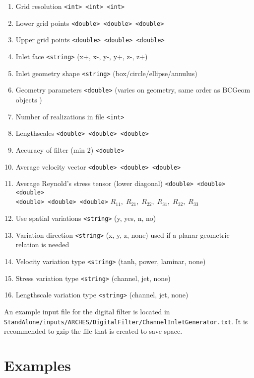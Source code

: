 \begin{enumerate}
\item Grid resolution \verb=<int> <int> <int>=
\item Lower grid points \verb=<double> <double> <double>=
\item Upper grid points \verb=<double> <double> <double>=
\item Inlet face \verb=<string>= (x+, x-, y-, y+, z-, z+)
\item Inlet geometry shape \verb=<string>= (box/circle/ellipse/annulus)
\item Geometry parameters \verb=<double>= (varies on geometry, same order as BCGeom objects )
\item Number of realizations in file \verb=<int>=
\item Lengthscales \verb=<double> <double> <double>=
\item Accuracy of filter (min 2) \verb=<double>=
\item Average velocity vector \verb=<double> <double> <double>=
\item Average Reynold's stress tensor (lower diagonal) \verb=<double> <double> <double>= \\
\verb=<double> <double> <double>= $R_{11},\; R_{21},\; R_{22},\; R_{31},\; R_{32},\; R_{33} $
\item Use spatial variations \verb=<string>= (y, yes, n, no)
\item Variation direction \verb=<string>= (x, y, z, none) used if a planar geometric relation is needed
\item Velocity variation type \verb=<string>= (tanh, power, laminar, none)
\item Stress variation type \verb=<string>= (channel, jet, none)
\item Lengthscale variation type \verb=<string>= (channel, jet, none)
\end{enumerate}

An example input file for the digital filter is located in \\ \verb=StandAlone/inputs/ARCHES/DigitalFilter/ChannelInletGenerator.txt=.  It is recommended to gzip the file that is created to save space.


 



\newpage
\section{Examples}

